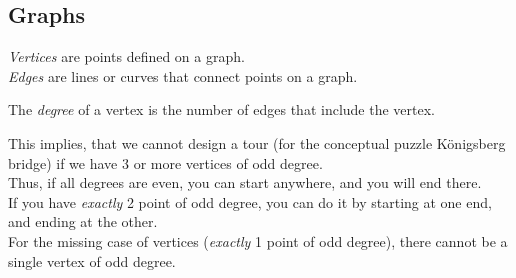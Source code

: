 \documentclass{article}
\def \proofDistance {5pt}
\begin{document}
    \subsection{Graphs}
        \begin{definition}
            \textit{Vertices} are points defined on a graph. \\
            \textit{Edges} are lines or curves that connect points on a graph. 
        \end{definition}

        \vspace{\proofDistance}

        \begin{definition}
            The \textit{degree} of a vertex is the number of edges that include the vertex.
        \end{definition}
        \indent This implies, that we cannot design a tour (for the conceptual puzzle Königsberg bridge) if we have 3 or more vertices of odd degree.\\
        
        \indent Thus, if all degrees are even, you can start anywhere, and you will end there. \\
        
        \indent If you have \textit{exactly} 2 point of odd degree, you can do it by starting at one end, and ending at the other. \\
        
        \indent For the missing case of vertices (\textit{exactly} 1 point of odd degree), there cannot be a single vertex of odd degree. \\
\end{document}
